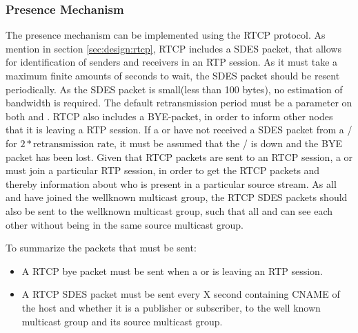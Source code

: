\subsubsection{Presence Mechanism} \label{sec:design:presencemechanism}
The presence mechanism can be implemented using the RTCP protocol. As mention in section \ref{sec:design:rtcp}, RTCP includes a SDES packet, that allows for identification of senders and receivers in an RTP session.
As it must take a maximum finite amounts of seconds to wait, the SDES  packet should be resent periodically. As the SDES packet is small(less than 100 bytes), no estimation of bandwidth is required. The default retransmission period must be a parameter on both \sub{} and \pub{}. RTCP also includes a BYE-packet, in order to inform other nodes that it is leaving a RTP session.
If a  or  have not received a SDES packet from a / for $2*\text{retransmission rate}$, it must be assumed that the / is down and the BYE packet has been lost.
Given that RTCP packets are sent to an RTCP session, a \sub{} or \pub{} must join a particular RTP session, in order to get the RTCP packets and thereby information about who is present in a particular source stream. As all \pubs{} and \subs{} have joined the wellknown multicast group, the RTCP SDES packets should also be sent to the wellknown multicast group, such that all \pubs{} and \subs{} can see each other without being in the same source multicast group.

To summarize the packets that must be sent:
\begin{itemize}
	\item A RTCP bye packet must be sent when a \sub or \pub is leaving an RTP session.
	\item A RTCP SDES packet must be sent every X second containing CNAME of the host and whether it is a publisher or subscriber, to the well known multicast group and its source multicast group.
\end{itemize}



